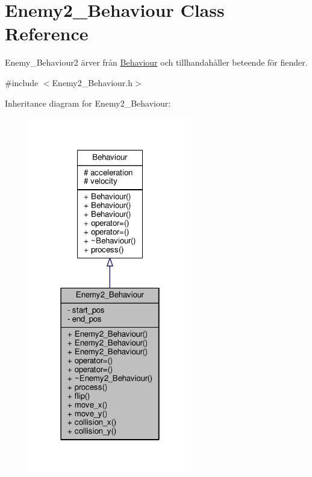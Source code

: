 \hypertarget{classEnemy2__Behaviour}{\section{Enemy2\+\_\+\+Behaviour Class Reference}
\label{classEnemy2__Behaviour}
}


Enemy\+\_\+\+Behaviour2 ärver från \hyperlink{classBehaviour}{Behaviour} och tillhandahåller beteende för fiender.  




{\ttfamily \#include $<$Enemy2\+\_\+\+Behaviour.\+h$>$}



Inheritance diagram for Enemy2\+\_\+\+Behaviour\+:\nopagebreak
\begin{figure}[H]
\begin{center}
\leavevmode
\includegraphics[width=202pt]{classEnemy2__Behaviour__inherit__graph}
\end{center}
\end{figure}


